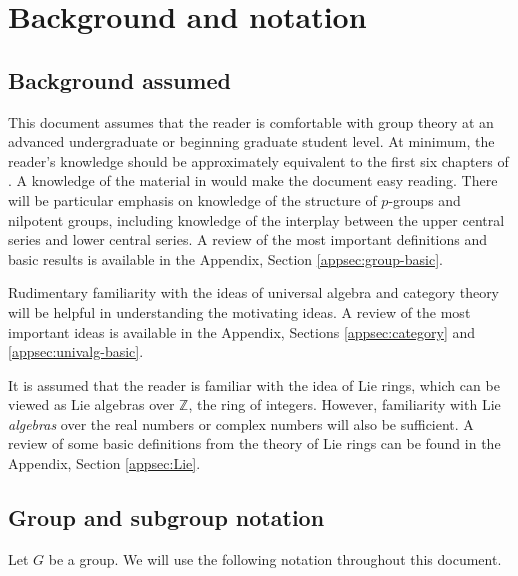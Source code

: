 \section*{Background and notation}

\subsection{Background assumed}

This document assumes that the reader is comfortable with group theory
at an advanced undergraduate or beginning graduate student level. At
minimum, the reader's knowledge should be approximately equivalent to
the first six chapters of \cite{DummitFoote}. A knowledge of the
material in \cite{RotmanGT} would make the document easy
reading. There will be particular emphasis on knowledge of the
structure of $p$-groups and nilpotent groups, including knowledge of
the interplay between the upper central series and lower central
series. A review of the most important definitions and basic results
is available in the Appendix, Section \ref{appsec:group-basic}.

Rudimentary familiarity with the ideas of universal algebra and
category theory will be helpful in understanding the motivating
ideas. A review of the most important ideas is available in the
Appendix, Sections \ref{appsec:category} and \ref{appsec:univalg-basic}.

It is assumed that the reader is familiar with the idea of Lie rings,
which can be viewed as Lie algebras over $\mathbb{Z}$, the ring of
integers. However, familiarity with Lie {\em algebras}
over the real numbers or complex numbers will also be sufficient. A
review of some basic definitions from the theory of Lie rings can be
found in the Appendix, Section \ref{appsec:Lie}.

\subsection{Group and subgroup notation}\label{sec:group-notation}

Let $G$ be a group. We will use the following notation throughout this
document.

